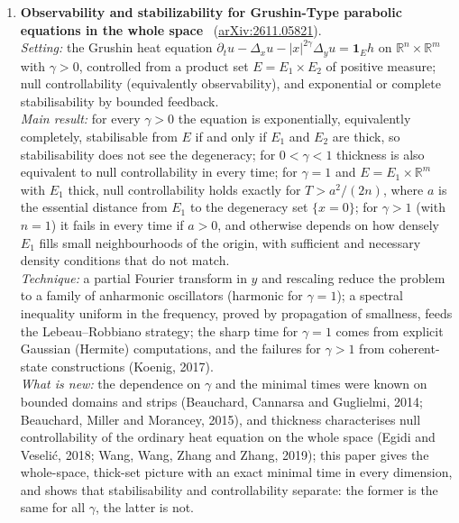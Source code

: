 \documentclass[11pt,a4paper]{article}
\newcommand{\Rset}{\mathbb{R}}
\begin{document}
\begin{enumerate}[leftmargin=*]
  \emph{Limitations:} the count is of complex solutions, whereas the number of real, stable stationary points depends on the data; single-input single-output and generic simple poles only; the sections on discrete time, examples and conclusions were cut off in the text read, and no numerical check of the count was visible.\\
  \emph{Verdict:} brings intersection theory into control to compute exactly a quantity that sets the size of any algebraic method certifying the global optimum, and gives the first exact count; confidence high (full text up to Section 4).
  \item \textbf{Observability and stabilizability for Grushin-Type parabolic equations in the whole space}~\cite{huang2026observability} (\href{https://arxiv.org/abs/2611.05821}{arXiv:2611.05821}).\\
  \emph{Setting:} the Grushin heat equation $\partial_t u - \Delta_x u - |x|^{2\gamma}\Delta_y u = \mathbf{1}_E h$ on $\Rset^n \times \Rset^m$ with $\gamma > 0$, controlled from a product set $E = E_1 \times E_2$ of positive measure; null controllability (equivalently observability), and exponential or complete stabilisability by bounded feedback.\\
  \emph{Main result:} for every $\gamma > 0$ the equation is exponentially, equivalently completely, stabilisable from $E$ if and only if $E_1$ and $E_2$ are thick, so stabilisability does not see the degeneracy; for $0 < \gamma < 1$ thickness is also equivalent to null controllability in every time; for $\gamma = 1$ and $E = E_1 \times \Rset^m$ with $E_1$ thick, null controllability holds exactly for $T > a^2/(2n)$, where $a$ is the essential distance from $E_1$ to the degeneracy set $\{x = 0\}$; for $\gamma > 1$ (with $n = 1$) it fails in every time if $a > 0$, and otherwise depends on how densely $E_1$ fills small neighbourhoods of the origin, with sufficient and necessary density conditions that do not match.\\
  \emph{Technique:} a partial Fourier transform in $y$ and rescaling reduce the problem to a family of anharmonic oscillators (harmonic for $\gamma = 1$); a spectral inequality uniform in the frequency, proved by propagation of smallness, feeds the Lebeau--Robbiano strategy; the sharp time for $\gamma = 1$ comes from explicit Gaussian (Hermite) computations, and the failures for $\gamma > 1$ from coherent-state constructions (Koenig, 2017).\\
  \emph{What is new:} the dependence on $\gamma$ and the minimal times were known on bounded domains and strips (Beauchard, Cannarsa and Guglielmi, 2014; Beauchard, Miller and Morancey, 2015), and thickness characterises null controllability of the ordinary heat equation on the whole space (Egidi and Veseli\'{c}, 2018; Wang, Wang, Zhang and Zhang, 2019); this paper gives the whole-space, thick-set picture with an exact minimal time in every dimension, and shows that stabilisability and controllability separate: the former is the same for all $\gamma$, the latter is not.\\

\end{enumerate}
\end{document}
